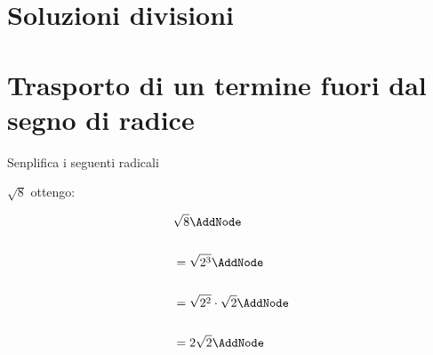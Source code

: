 			\section{Soluzioni divisioni}
			\tcbinputrecords
\section{Trasporto di un termine fuori dal segno di radice}
Senplifica i seguenti radicali
\tcbstartrecording
	\begin{exercise}
		$\sqrt{8}$
		\tcblower
		ottengo:
		\begin{NodesList}
			\begin{align*}
				&\sqrt{8} \AddNode\\
				&\\
				&=\sqrt{2^3} \AddNode\\
				&\\
				&=\sqrt{2^2}\cdot\sqrt{2} \AddNode\\
				&\\
				&=2\sqrt{2} \AddNode
			\end{align*}
						
					\end{NodesList}
				\end{exercise}

